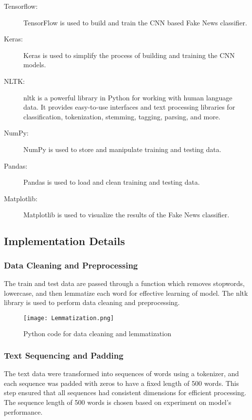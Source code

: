 \begin{description}
    \item[Tensorflow:] TensorFlow is used to build and train the CNN based Fake News classifier.
    \item[Keras:] Keras is used to simplify the process of building and training the CNN models.
    \item[NLTK:] \ac{nltk} is a powerful library in Python for working with human language data.  It provides easy-to-use interfaces and text processing libraries for classification, tokenization, stemming, tagging, parsing, and more.
    \item[NumPy:] NumPy is used to store and manipulate training and testing data.
    \item[Pandas:] Pandas is used to load and clean training and testing data.
    \item[Matplotlib:] Matplotlib is used to visualize the results of the Fake News classifier.
\end{description}

\subsection{Implementation Details}

\subsubsection{Data Cleaning and Preprocessing} The train and test data are passed through a function which removes stopwords, lowercase, and then lemmatize each word for effective learning of model. The \ac{nltk} library is used to perform data cleaning and preprocessing.

\begin{figure}[h]
    \centering
    \texttt{[image: Lemmatization.png]}
    \caption{Python code for data cleaning and lemmatization}
    \label{fig:lemmatization}
\end{figure}

\subsubsection{Text Sequencing and Padding} The text data were transformed into sequences of words using a tokenizer, and each sequence was padded with zeros to have a fixed length of 500 words. This step ensured that all sequences had consistent dimensions for efficient processing. The sequence length of 500 words is chosen based on experiment on model's performance.

